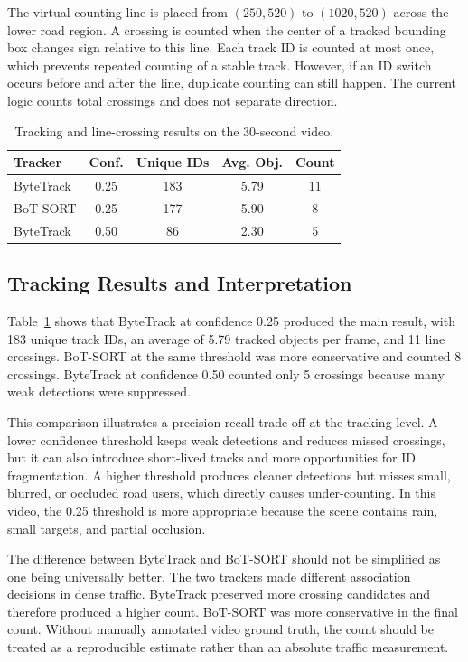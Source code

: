 \documentclass[10pt,twocolumn]{article}
\begin{document}
The virtual counting line is placed from $(250,520)$ to $(1020,520)$ across the lower road region. A crossing is counted when the center of a tracked bounding box changes sign relative to this line. Each track ID is counted at most once, which prevents repeated counting of a stable track. However, if an ID switch occurs before and after the line, duplicate counting can still happen. The current logic counts total crossings and does not separate direction.

\begin{table}[H]
\centering
\caption{Tracking and line-crossing results on the 30-second video.}
\label{tab:tracking}
\small
\begin{tabular}{lcccc}
\toprule
Tracker & Conf. & Unique IDs & Avg. Obj. & Count\\
\midrule
ByteTrack & 0.25 & 183 & 5.79 & 11\\
BoT-SORT & 0.25 & 177 & 5.90 & 8\\
ByteTrack & 0.50 & 86 & 2.30 & 5\\
\bottomrule
\end{tabular}
\end{table}

\subsection{Tracking Results and Interpretation}

Table~\ref{tab:tracking} shows that ByteTrack at confidence 0.25 produced the main result, with 183 unique track IDs, an average of 5.79 tracked objects per frame, and 11 line crossings. BoT-SORT at the same threshold was more conservative and counted 8 crossings. ByteTrack at confidence 0.50 counted only 5 crossings because many weak detections were suppressed.

This comparison illustrates a precision-recall trade-off at the tracking level. A lower confidence threshold keeps weak detections and reduces missed crossings, but it can also introduce short-lived tracks and more opportunities for ID fragmentation. A higher threshold produces cleaner detections but misses small, blurred, or occluded road users, which directly causes under-counting. In this video, the 0.25 threshold is more appropriate because the scene contains rain, small targets, and partial occlusion.

The difference between ByteTrack and BoT-SORT should not be simplified as one being universally better. The two trackers made different association decisions in dense traffic. ByteTrack preserved more crossing candidates and therefore produced a higher count. BoT-SORT was more conservative in the final count. Without manually annotated video ground truth, the count should be treated as a reproducible estimate rather than an absolute traffic measurement.
\end{document}
